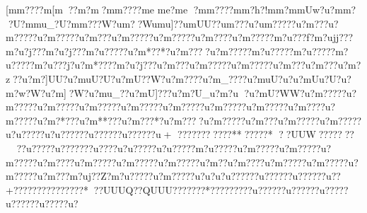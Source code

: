{{{{{{{{{{{{{{{{{{{{{{{{{{{{{{{{{{{{{{{{{{{{{{{{{{{{{{{{{{{{{{{{{{{{{{{{{{{{{{{{{{{{{{{{{{{{{{{{{{{{{{{{{{{{{{{{{{{{{{{{{{{{{{{{{{{{{{{{{{{{{{{{{{{{{{{{{{{{{{{{{{{{{{{{{{{{{{{{{{{{{{{{{{{{{{{{{{{{{{{{{{{{{{{{{{{{{{{{{{{{{{{{{{{{{{{{{{{{{{{{{{{{{{{{{{{{{{{{{{{{{{{{{{{{{{{{{{{{{{{{{{{{{{{{{{{{{{{{{{{{{{{{{{{{{{{{{{{{{{{{{{{{{{{{{{{{{{{{{{{{{{{{{{{{{{{{{{{{{{{{{{{{{{{{{{{{{{{{{{{{{{{{{{{{{{{{{{{{{{{{{{{{{{{{{{{{{{{{{{{{{{{{{{{{{{{{{{{{{{{{{{{{{{{{{{{{{{{{{{{{{{{{{{{{{{{{{{{{{{{{{{{{{{{{{{{{{{{{{{{{{{{{{{{{{{{{{{{{{{{{{{{{{{{{{{{{{{{{{{{{{{{{{{{{{{{{{{{{{{{{{{{{{{{{{{{{{{{{{{{{{{{{{{{{{{{{{{{{{{{{{{{{{{{{{{{{{{{{{{{{{{{{{{{{{{{{{{{{{{{{{{{{{{{{{{{{{{{{{{{{{{{{{{{{{{{{{{{{{{{{{{{{{{{{{{{{{{{{{{{{{{{{{{{{{{{{{{{{{{{{{{{{{{{{{{{{{{{{{{{{{{{{{{{{{{{{{{{{{{{{{{{{{{{{{{{{{{{{{{{{{{{{{{{{{{{{{{{{{{{{{{{{{{{{{{{{{{{{{{{{{{{{{{{{{{{{{{{{{{{{{{{{{{{{{{{{{{{{{{{{{{{{{{{{{{{{{{{{{{{{{{{{{{{{{{{{{{{{{{{{{{{{{{{{{{{{{{{{{{{{{{{{{{{{{{{{{{{{{{{{{{{{{{{{{{{{{{{{{{{{{{{{{{{{{{{{{{{{{{{{{{{{{{{{{{{{{{{{{{{[m{m????{m[m??{m?m   ?m{m????{m{e    {m{e   ?{m{e   ?m{m????{m{m?h?!{m{m    ?m{mUw?u?m{m??U?m{mu_?U?m{m???W?u{m??W{u{mu]??{u{mUU??{u{m???u?u{m?????u?m???u?m?????u?m?????u?m???u?m?????u?m?????u?m????u?m?????m?u???f?m?ujj???m?u?j???m?u?j???m?u?????u?m*??*?u?m????u?m?????m?u?????m?u?????m?u?????m?u???j?u?m*????m?u?j???u?m???u?m?????u?m?????u?m???u?m???u?m?z??u?m?]UU?u?muU?U?u?mU??W?u?m????u?m_????u?muU?u?u?mUu?U?u?m?w?W?u?m]?W?u?mu_??u?mU]???u?m?U_u?m?u   ?u?mU?WW?u?m?????u?m?????u?m?????u?m?????u?m?????u?m?????u?m?????u?m?????u?m????u?m?????u?m?*???u?m**???u?m???*?u?m????u?m?????u?m???u?m?????u?m?????u?u?????u?u?????}?u?????}?u?????}?u+
???}??????}??**?????*
??UUW}???????}?}?u?????u?}?????}?u{????u?u?????u?u?????m?u?????u?m?????u?m?????u?m?????u?m????u?m?????u?m?????u?m?????u?m??u?m????u?m?????u?m?????u?m?????u?m???m?uj??Z?m?u?????u?m?????u?u    ?u?u?????}?u?????}?u?????}?u??+??}?}?????}?}?????}?}* ?}?}UUUQ?}?}QUUU?}?}   ??}?}??*??}?}?????}?u?????}?u?????}?u????}?u?????}?u?????u?}
}}}}}}}}}}}}}}}}}}}}}}}}}}}}}}}}}}}}}}}}}}}}}}}}}}}}}}}}}}}}}}}}}}}}}}}}}}}}}}}}}}}}}}}}}}}}}}}}}}}}}}}}}}}}}}}}}}}}}}}}}}}}}}}}}}}}}}}}}}}}}}}}}}}}}}}}}}}}}}}}}}}}}}}}}}}}}}}}}}}}}}}}}}}}}}}}}}}}}}}}}}}}}}}}}}}}}}}}}}}}}}}}}}}}}}}}}}}}}}}}}}}}}}}}}}}}}}}}}}}}}}}}}}}}}}}}}}}}}}}}}}}}}}}}}}}}}}}}}}}}}}}}}}}}}}}}}}}}}}}}}}}}}}}}}}}}}}}}}}}}}}}}}}}}}}}}}}}}}}}}}}}}}}}}}}}}}}}}}}}}}}}}}}}}}}}}}}}}}}}}}}}}}}}}}}}}}}}}}}}}}}}}}}}}}}}}}}}}}}}}}}}}}}}}}}}}}}}}}}}}}}}}}}}}}}}}}}}}}}}}}}}}}}}}}}}}}}}}}}}}}}}}}}}}}}}}}}}}}}}}}}}}}}}}}}}}}}}}}}}}}}}}}}}}}}}}}}}}}}}}}}}}}}}}}}}}}}}}}}}}}}}}}}}}}}}}}}}}}}}}}}}}}}}}}}}}}}}}}}}}}}}}}}}}}}}}}}}}}}}}}}}}}}}}}}}}}}}}}}}}}}}}}}}}}}}}}}}}}}}}}}}}}}}}}}}}}}}}}}}}}}}}}}}}}}}}}}}}}}}}}}}}}}}}}}}}}}}}}}}}}}}}}}}}}}}}}}}}}}}}}}}}}}}}}}}}}}}}}}}}}}}}}}}}}}}}}}}}}}}}}}}}}}}}}}}}}}}}}}}}}}}}}}}}}}}}}}}}}}}}}}}}}}}}}}}}}}}}}}}}}}}}}}}}}}}}}}}}}}}}}}}}}}}}}}}}}}}}}}}}}}}}}}}}}}}}}}}}}}}}}}}}}}}}}}}}}}}}}}}}}}}}}}}}}}}}}}}}}}}}}}}}}}}}}}}}}}}}}}}}}}}}}}}}}}}}
